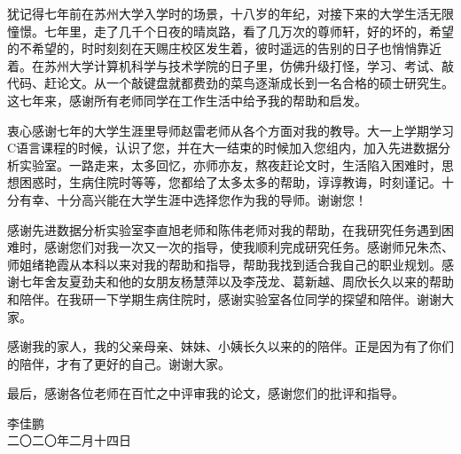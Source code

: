 \begin{thanks}
    犹记得七年前在苏州大学入学时的场景，十八岁的年纪，对接下来的大学生活无限憧憬。七年里，走了几千个日夜的晴岚路，看了几万次的尊师轩，好的坏的，希望的不希望的，时时刻刻在天赐庄校区发生着，彼时遥远的告别的日子也悄悄靠近着。在苏州大学计算机科学与技术学院的日子里，仿佛升级打怪，学习、考试、敲代码、赶论文。从一个敲键盘就都费劲的菜鸟逐渐成长到一名合格的硕士研究生。这七年来，感谢所有老师同学在工作生活中给予我的帮助和启发。

    衷心感谢七年的大学生涯里导师赵雷老师从各个方面对我的教导。大一上学期学习C语言课程的时候，认识了您，并在大一结束的时候加入您组内，加入先进数据分析实验室。一路走来，太多回忆，亦师亦友，熬夜赶论文时，生活陷入困难时，思想困惑时，生病住院时等等，您都给了太多太多的帮助，谆谆教诲，时刻谨记。十分有幸、十分高兴能在大学生涯中选择您作为我的导师。谢谢您！

    感谢先进数据分析实验室李直旭老师和陈伟老师对我的帮助，在我研究任务遇到困难时，感谢您们对我一次又一次的指导，使我顺利完成研究任务。感谢师兄朱杰、师姐绪艳霞从本科以来对我的帮助和指导，帮助我找到适合我自己的职业规划。感谢七年舍友夏劲夫和他的女朋友杨慧萍以及李茂龙、葛新越、周欣长久以来的帮助和陪伴。在我研一下学期生病住院时，感谢实验室各位同学的探望和陪伴。谢谢大家。

    感谢我的家人，我的父亲母亲、妹妹、小姨长久以来的的陪伴。正是因为有了你们的陪伴，才有了更好的自己。谢谢大家。

    最后，感谢各位老师在百忙之中评审我的论文，感谢您们的批评和指导。

\begin{flushright}
李佳鹏\qquad\qquad\qquad\qquad  \\
二〇二〇年二月十四日  \\
\end{flushright}

\end{thanks}
